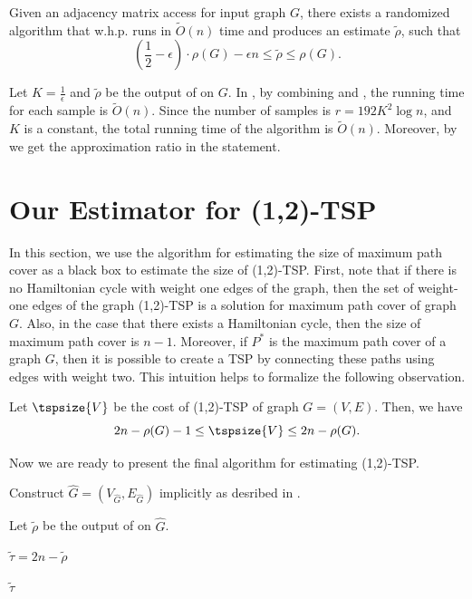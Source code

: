 \begin{theorem}\label{thm: disjoint-paths-algorithm}
Given an adjacency matrix access for input graph $G$, there exists a randomized algorithm that w.h.p. runs in $\widetilde{O}(n)$ time and  produces an estimate $\tilde{\rho}$, such that
$$
\left(\frac{1}{2} - \epsilon\right)\cdot\rho(G) - \epsilon n \leq \tilde{\rho} \leq \rho(G).
$$
\end{theorem}
\begin{myproof}
Let $K = \frac{1}{\epsilon}$ and $\tilde{\rho}$ be the output of  on $G$. In , by combining  and , the running time for each sample is $\tilde{O}(n)$. Since the number of samples is $r = 192K^2\log n$, and $K$ is a constant, the total running time of the algorithm is $\tilde{O}(n)$. Moreover, by  we get the approximation ratio in the statement.
\end{myproof}


\section{Our Estimator for (1,2)-TSP}
In this section, we use the algorithm for estimating the size of maximum path cover as a black box to estimate the size of (1,2)-TSP. First, note that if there is no Hamiltonian cycle with weight one edges of the graph, then the set of weight-one edges of the graph (1,2)-TSP is a solution for maximum path cover of graph $G$. Also, in the case that there exists a Hamiltonian cycle, then the size of maximum path cover is $n-1$. Moreover, if $P^*$ is the maximum path cover of a graph $G$, then it is possible to create a TSP by connecting these paths using edges with weight two. This intuition helps to formalize the following observation.

\begin{observation}\label{obs: bounding-TSP-with-DP}
Let $\tspsize{V}$ be the cost of (1,2)-TSP of graph $G = (V, E)$. Then, we have 
$$2n - \rho(G) - 1 \leq \tspsize{V} \leq 2n - \rho(G).$$
\end{observation}

Now we are ready to present the final algorithm for estimating (1,2)-TSP.


\begin{algorithm}
\caption{Final algorithm for (1,2)-TSP.}
\label{alg: 12tsp}

    Construct $\hat{G} = (V_{\hat{G}}, E_{\hat{G}})$ implicitly as desribed in .
    
    Let $\tilde{\rho}$ be the output of  on $\hat{G}$.
    
    $\tilde{\tau} = 2n - \tilde{\rho}$
    
    \Return $\tilde{\tau}$
\end{algorithm}

